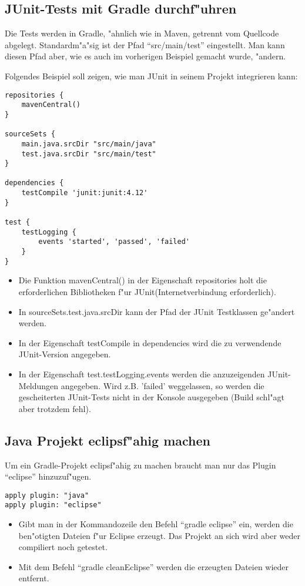 \documentclass[a4paper]{article}
\begin{document}
\subsection{JUnit-Tests mit Gradle durchf"uhren}
Die Tests werden in Gradle, "ahnlich wie in Maven, getrennt vom Quellcode abgelegt. Standardm"a"sig ist der Pfad ``src/main/test'' eingestellt. Man kann diesen Pfad aber, wie es auch im vorherigen Beispiel gemacht wurde, "andern.

Folgendes Beispiel soll zeigen, wie man JUnit in seinem Projekt integrieren kann:
\begin{verbatim}
repositories {
    mavenCentral()
}

sourceSets {
    main.java.srcDir "src/main/java"
    test.java.srcDir "src/main/test"
}

dependencies {
    testCompile 'junit:junit:4.12'
}

test {
    testLogging {
        events 'started', 'passed', 'failed'
    }
}
\end{verbatim}
\begin{itemize}
\item Die Funktion mavenCentral() in der Eigenschaft repositories holt die erforderlichen Bibliotheken f"ur JUnit(Internetverbindung erforderlich).
\item In sourceSets.test.java.srcDir kann der Pfad der JUnit Testklassen ge"andert werden.
\item In der Eigenschaft testCompile in dependencies wird die zu verwendende JUnit-Version angegeben.
\item In der Eigenschaft test.testLogging.events werden die anzuzeigenden JUnit-Meldungen angegeben. Wird z.B. 'failed' weggelassen, so werden die gescheiterten JUnit-Tests nicht in der Konsole ausgegeben (Build schl"agt aber trotzdem fehl).
\end{itemize}

\subsection{Java Projekt eclipsf"ahig machen}
Um ein Gradle-Projekt eclipsf"ahig zu machen braucht man nur das Plugin ``eclipse'' hinzuzuf"ugen.
\begin{verbatim}
apply plugin: "java"
apply plugin: "eclipse"
\end{verbatim}

\begin{itemize}
\item Gibt man in der Kommandozeile den Befehl ``gradle eclipse'' ein, werden die ben"otigten Dateien f"ur Eclipse erzeugt. Das Projekt an sich wird aber weder compiliert noch getestet.
\item Mit dem Befehl ``gradle cleanEclipse'' werden die erzeugten Dateien wieder entfernt.
\end{itemize}
\end{document}
